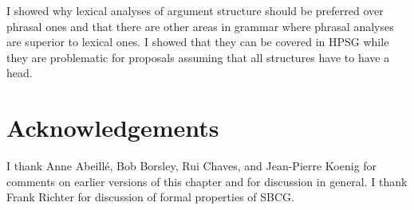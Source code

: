 \documentclass[output=paper]{langsci/langscibook}
\begin{document}
I showed why lexical analyses of argument structure should be
preferred over phrasal ones and that there are other areas in grammar where phrasal analyses are
superior to lexical ones. I showed that they can be covered in HPSG while they are problematic for
proposals assuming that all structures have to have a head. 





\section*{Acknowledgements}

I thank Anne Abeillé, Bob Borsley, Rui Chaves, and Jean-Pierre Koenig for comments on earlier
versions of this chapter and for discussion in general. I thank Frank Richter for discussion of
formal properties of SBCG. 


{\sloppy
\printbibliography[heading=subbibliography,notkeyword=this] 
}
\end{document}

